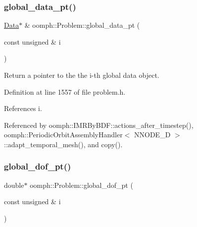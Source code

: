 \mbox{\label{classoomph_1_1Problem_ae7e2bc78b6761fde803e9058658d1ded}} 
\subsubsection{\texorpdfstring{global\+\_\+data\+\_\+pt()}{global\_data\_pt()}}
{\footnotesize\ttfamily \hyperlink{classoomph_1_1Data}{Data}$\ast$ \& oomph\+::\+Problem\+::global\+\_\+data\+\_\+pt (\begin{DoxyParamCaption}\item[{const unsigned \&}]{i }\end{DoxyParamCaption})\hspace{0.3cm}{\ttfamily [inline]}}



Return a pointer to the the i-\/th global data object. 



Definition at line 1557 of file problem.\+h.



References i.



Referenced by oomph\+::\+I\+M\+R\+By\+B\+D\+F\+::actions\+\_\+after\+\_\+timestep(), oomph\+::\+Periodic\+Orbit\+Assembly\+Handler$<$ N\+N\+O\+D\+E\+\_\+D $>$\+::adapt\+\_\+temporal\+\_\+mesh(), and copy().

\mbox{\label{classoomph_1_1Problem_a491354401f780ccc114ceb76f5cacef0}} 
\subsubsection{\texorpdfstring{global\+\_\+dof\+\_\+pt()}{global\_dof\_pt()}}
{\footnotesize\ttfamily double$\ast$ oomph\+::\+Problem\+::global\+\_\+dof\+\_\+pt (\begin{DoxyParamCaption}\item[{const unsigned \&}]{i }\end{DoxyParamCaption})\hspace{0.3cm}{\ttfamily [inline]}}



